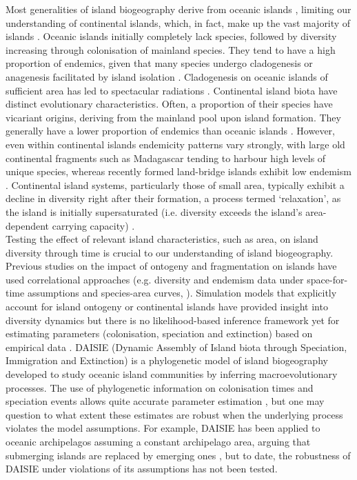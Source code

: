 \documentclass{article}
\begin{document}
Most generalities of island biogeography derive from oceanic islands \citep{whittaker_general_2008}, limiting our understanding of continental islands, which, in fact, make up the vast majority of islands \citep{meiri_oceanic_2017}. Oceanic islands initially completely lack species, followed by diversity increasing through colonisation of mainland species. They tend to have a high proportion of endemics, given that many species undergo cladogenesis or anagenesis facilitated by island isolation \citep{valente_simple_2020}. Cladogenesis on oceanic islands of sufficient area has led to spectacular radiations \citep{losos_adaptation_2009}. Continental island biota have distinct evolutionary characteristics. Often, a proportion of their species have vicariant origins, deriving from the mainland pool upon island formation. They generally have a lower proportion of endemics than oceanic islands \citep{ali_islands_2018}. However, even within continental islands endemicity patterns vary strongly, with large old continental fragments such as Madagascar tending to harbour high levels of unique species, whereas recently formed land-bridge islands exhibit low endemism \citep{ali_mammals_2019}. Continental island systems, particularly those of small area, typically exhibit a decline in diversity right after their formation, a process termed ‘relaxation’, as the island is initially supersaturated (i.e. diversity exceeds the island’s area-dependent carrying capacity) \citep{diamond_biogeographic_1972, wilcox_supersaturated_1978, tilman_habitat_1994, kuussaari_extinction_2009}. \\

Testing the effect of relevant island characteristics, such as area, on island diversity through time is crucial to our understanding of island biogeography. Previous studies on the impact of ontogeny and fragmentation on islands have used correlational approaches (e.g. diversity and endemism data under space-for-time assumptions and species-area curves, \cite{he_speciesarea_2011, damgaard_critique_2019}). Simulation models that explicitly account for island ontogeny \citep{valente_effects_2014, borregaard_general_2016} or continental islands \citep{rosindell_unified_2013} have provided insight into diversity dynamics but there is no likelihood-based inference framework yet for estimating parameters (colonisation, speciation and extinction) based on empirical data \citep{leidinger_biodiversity_2017}. DAISIE (Dynamic Assembly of Island biota through Speciation, Immigration and Extinction) is a phylogenetic model of island biogeography developed to study oceanic island communities by inferring macroevolutionary processes. The use of phylogenetic information on colonisation times and speciation events allows quite accurate parameter estimation \citep{valente_using_2018}, but one may question to what extent these estimates are robust when the underlying process violates the model assumptions. For example, DAISIE has been applied to oceanic archipelagos assuming a constant archipelago area, arguing that submerging islands are replaced by emerging ones \citep{valente_equilibrium_2015}, but to date, the robustness of DAISIE under violations of its assumptions has not been tested. \\
\end{document}
